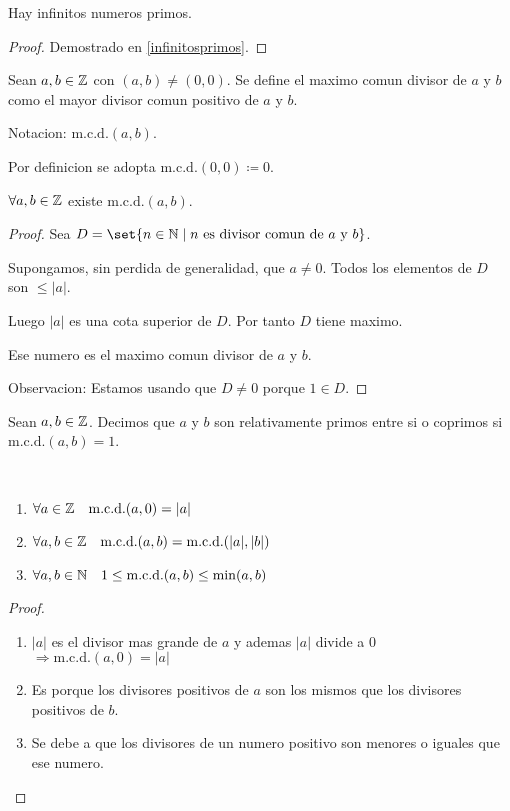 \begin{theorem}
	Hay infinitos numeros primos.
\end{theorem}
\begin{proof}
	Demostrado en \eqref{infinitosprimos}.
\end{proof}

\begin{definition}
	Sean \(a,b \in \mathbb{Z} \) con \((a,b) \neq (0,0)\). Se define el maximo comun divisor de \(a \) y \(b \) como el mayor divisor comun positivo de \(a \) y \(b \).
	
	Notacion: \(\mathrm{m.c.d.}(a,b) \).
	
	Por definicion se adopta \(\mathrm{m.c.d.}(0,0) \coloneqq 0\).
\end{definition}

\begin{proposition}[Existencia m.c.d]
	\(\forall a,b \in \mathbb{Z} \) existe \(\mathrm{m.c.d.}(a,b) \).
\end{proposition}
\begin{proof}
	Sea \(D = \set{n \in \N \mid n \text{ es divisor comun de } a \text{ y } b }\).
	
	Supongamos, sin perdida de generalidad, que \(a \neq 0 \). Todos los elementos de \(D \) son \(\leq |a| \).
	
	Luego \(|a| \) es una cota superior de \(D \). Por tanto \(D \) tiene maximo.
	
	Ese numero es el maximo comun divisor de \(a \) y \(b \).
	
	Observacion: Estamos usando que \(D \neq 0 \) porque \(1 \in D \).
\end{proof}

\begin{definition}
	Sean \(a,b \in \mathbb{Z} \). Decimos que \(a \) y \(b \) son relativamente primos entre si o coprimos si \(\mathrm{m.c.d.}(a,b) = 1 \).
\end{definition}

\begin{proposition}
	~\begin{enumerate}
		\item \(\forall a \in \mathbb{Z} \quad \mathrm{m.c.d.}(a,0) = |a| \)
		\item \(\forall a,b \in \mathbb{Z} \quad \mathrm{m.c.d.}(a,b) = \mathrm{m.c.d.}(|a|,|b|) \)
		\item \(\forall a,b \in \mathbb{N} \quad 1 \leq \mathrm{m.c.d.}(a,b) \leq \mathrm{min}(a,b)  \)
	\end{enumerate}
\end{proposition}
\begin{proof}
	~\begin{enumerate}
		\item \(|a| \) es el divisor mas grande de \(a \) y ademas \(|a| \) divide a 0 \(\Rightarrow \mathrm{m.c.d.}(a,0) = |a| \)
		\item Es porque los divisores positivos de \(a \) son los mismos que los divisores positivos de \(b \).
		\item Se debe a que los divisores de un numero positivo son menores o iguales que ese numero.
	\end{enumerate}
\end{proof}

